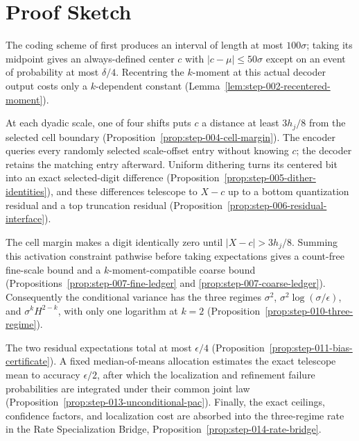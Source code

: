 \section{Proof Sketch}\label{sec:proof-sketch}

The coding scheme of \citet[Theorem~16]{lau2026orderoptimal} first produces
an interval of length at most \(100\sigma\); taking its midpoint gives an
always-defined center \(c\) with \(|c-\mu|\leq50\sigma\) except on an event
of probability at most \(\delta/4\).  Recentring the \(k\)-moment at this
actual decoder output costs only a \(k\)-dependent constant
(Lemma~\ref{lem:step-002-recentered-moment}).

At each dyadic scale, one of four shifts puts \(c\) a distance at least
\(3h_j/8\) from the selected cell boundary
(Proposition~\ref{prop:step-004-cell-margin}).  The encoder queries every
randomly selected scale-offset entry without knowing \(c\); the decoder
retains the matching entry afterward.  Uniform dithering turns its centered
bit into an exact selected-digit difference
(Proposition~\ref{prop:step-005-dither-identities}), and these differences
telescope to \(X-c\) up to a bottom quantization residual and a top
truncation residual (Proposition~\ref{prop:step-006-residual-interface}).

The cell margin makes a digit identically zero until
\(|X-c|>3h_j/8\).  Summing this activation constraint pathwise before taking
expectations gives a count-free fine-scale bound and a \(k\)-moment-compatible
coarse bound (Propositions~\ref{prop:step-007-fine-ledger} and
\ref{prop:step-007-coarse-ledger}).  Consequently the conditional variance
has the three regimes \(\sigma^2\), \(\sigma^2\log(\sigma/\epsilon)\), and
\(\sigma^kH^{2-k}\), with only one logarithm at \(k=2\)
(Proposition~\ref{prop:step-010-three-regime}).

The two residual expectations total at most \(\epsilon/4\)
(Proposition~\ref{prop:step-011-bias-certificate}).  A fixed
median-of-means allocation estimates the exact telescope mean to accuracy
\(\epsilon/2\), after which the localization and refinement failure
probabilities are integrated under their common joint law
(Proposition~\ref{prop:step-013-unconditional-pac}).  Finally, the exact
ceilings, confidence factors, and localization cost are absorbed into the
three-regime rate in the Rate Specialization Bridge,
Proposition~\ref{prop:step-014-rate-bridge}.
